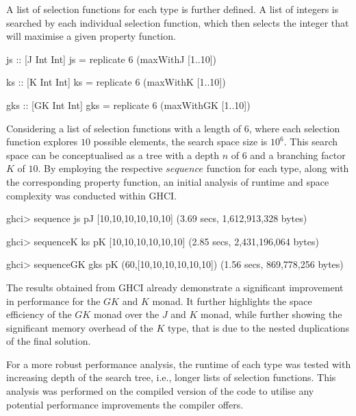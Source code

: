\documentclass[runningheads]{llncs}
\begin{document}
A list of selection functions for each type is further defined. A list
of integers is searched by each individual selection function, which
then selects the integer that will maximise a given property function.

\begin{code}
js :: [J Int Int]
js = replicate 6 (maxWithJ [1..10])
\end{code}

\begin{code}
ks :: [K Int Int]
ks = replicate 6 (maxWithK [1..10])
\end{code}

\begin{code}
gks :: [GK Int Int]
gks = replicate 6 (maxWithGK [1..10])
\end{code}

Considering a list of selection functions with a length of \(6\), where
each selection function explores \(10\) possible elements, the search
space size is \(10^6\). This search space can be conceptualised as a
tree with a depth \(n\) of \(6\) and a branching factor \(K\) of \(10\).
By employing the respective \(sequence\) function for each type, along
with the corresponding property function, an initial analysis of runtime
and space complexity was conducted within GHCI.

\begin{haskell}
ghci> sequence js pJ 
[10,10,10,10,10,10]
(3.69 secs, 1,612,913,328 bytes)

ghci> sequenceK ks pK
[10,10,10,10,10,10]
(2.85 secs, 2,431,196,064 bytes)

ghci> sequenceGK gks pK
(60,[10,10,10,10,10,10])
(1.56 secs, 869,778,256 bytes)
\end{haskell}

The results obtained from GHCI already demonstrate a significant
improvement in performance for the \(GK\) and \(K\) monad. It further
highlights the space efficiency of the \(GK\) monad over the \(J\) and
\(K\) monad, while further showing the significant memory overhead of
the \(K\) type, that is due to the nested duplications of the final
solution.

For a more robust performance analysis, the runtime of each type was
tested with increasing depth of the search tree, i.e., longer lists of
selection functions. This analysis was performed on the compiled version
of the code to utilise any potential performance improvements the
compiler offers.
\end{document}
